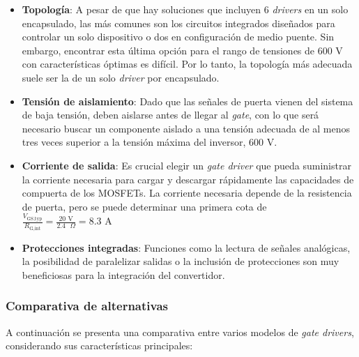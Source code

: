 \begin{itemize}
	\item \textbf{Topología}: A pesar de que hay soluciones que incluyen 6 \textit{drivers} en un solo encapsulado, las más comunes son los circuitos integrados diseñados para controlar un solo dispositivo o dos en configuración de medio puente. Sin embargo, encontrar esta última opción para el rango de tensiones de 600 V con características óptimas es difícil. Por lo tanto, la topología más adecuada suele ser la de un solo \textit{driver} por encapsulado.
	\item \textbf{Tensión de aislamiento}: Dado que las señales de puerta vienen del sistema de baja tensión, deben aislarse antes de llegar al \textit{gate}, con lo que será necesario buscar un componente aislado a una tensión adecuada de al menos tres veces superior a la tensión máxima del inversor, 600 V. 
	\item \textbf{Corriente de salida}: Es crucial elegir un \textit{gate driver} que pueda suministrar la corriente necesaria para cargar y descargar rápidamente las capacidades de compuerta de los MOSFETs. La corriente necesaria depende de la resistencia de puerta, pero se puede determinar una primera cota de $\frac{V_{\text{GS,typ}}}{R_{\text{G,int}}} = \frac{20 \text{ V}}{2.4 \text{ }\Omega} = 8.3 \text{ A}$
	\item \textbf{Protecciones integradas}: Funciones como la lectura de señales analógicas, la posibilidad de paralelizar salidas o la inclusión de protecciones son muy beneficiosas para la integración del convertidor.
\end{itemize}

\subsubsection{Comparativa de alternativas}

A continuación se presenta una comparativa entre varios modelos de \textit{gate drivers}, considerando sus características principales:

